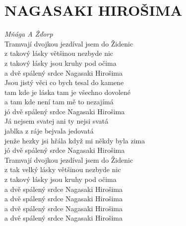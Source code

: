 \section*{\Huge NAGASAKI HIROŠIMA}
\emph{Mňága A Žďorp}\\

Tramvají dvojkou jezdíval jsem do Židenic\\
z takový lásky většinou nezbyde nic\\
z takový lásky jsou kruhy pod očima\\
a dvě spálený srdce Nagasaki Hirošima\\

Jsou jistý věci co bych tesal do kamene\\
tam kde je láska tam je všechno dovolené\\
a tam kde není tam mě to nezajímá\\
jó dvě spálený srdce Nagasaki Hirošima\\

Já nejsem svatej ani ty nejsi svatá\\
jablka z ráje bejvala jedovatá\\
jenže hezky jsi hřála když mi někdy byla zima\\
jó dvě spálený srdce Nagasaki Hirošima\\

Tramvají dvojkou jezdíval jsem do Židenic\\
z tak velký lásky většinou nezbyde nic\\
z takový lásky jsou kruhy pod očima\\
a dvě spálený srdce Nagasaki Hirošima\\
a dvě spálený srdce Nagasaki Hirošima\\
a dvě spálený srdce Nagasaki Hirošima\\
a dvě spálený srdce Nagasaki Hirošima

\newpage
